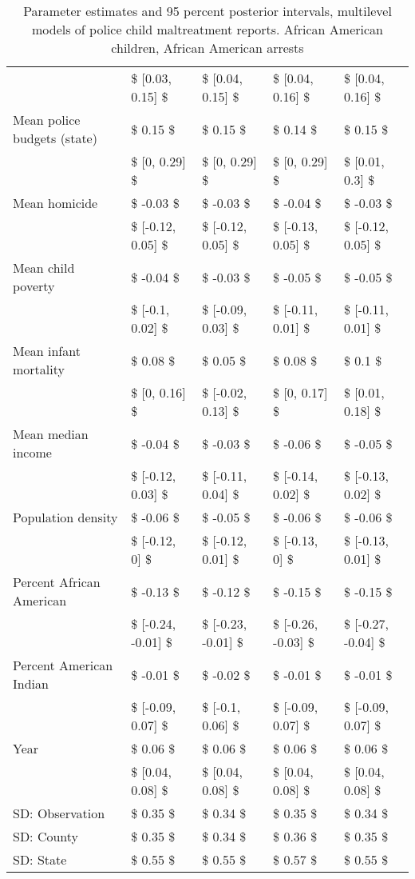 \begin{table}[ht]
\begin{tabular}{lllll}
   & \$ [0.03, 0.15] \$ & \$ [0.04, 0.15] \$ & \$ [0.04, 0.16] \$ & \$ [0.04, 0.16] \$ \\ 
  Mean police budgets (state) & \$ 0.15 \$ & \$ 0.15 \$ & \$ 0.14 \$ & \$ 0.15 \$ \\ 
   & \$ [0, 0.29] \$ & \$ [0, 0.29] \$ & \$ [0, 0.29] \$ & \$ [0.01, 0.3] \$ \\ 
  Mean homicide & \$ -0.03 \$ & \$ -0.03 \$ & \$ -0.04 \$ & \$ -0.03 \$ \\ 
   & \$ [-0.12, 0.05] \$ & \$ [-0.12, 0.05] \$ & \$ [-0.13, 0.05] \$ & \$ [-0.12, 0.05] \$ \\ 
  Mean child poverty & \$ -0.04 \$ & \$ -0.03 \$ & \$ -0.05 \$ & \$ -0.05 \$ \\ 
   & \$ [-0.1, 0.02] \$ & \$ [-0.09, 0.03] \$ & \$ [-0.11, 0.01] \$ & \$ [-0.11, 0.01] \$ \\ 
  Mean infant mortality & \$ 0.08 \$ & \$ 0.05 \$ & \$ 0.08 \$ & \$ 0.1 \$ \\ 
   & \$ [0, 0.16] \$ & \$ [-0.02, 0.13] \$ & \$ [0, 0.17] \$ & \$ [0.01, 0.18] \$ \\ 
  Mean median income & \$ -0.04 \$ & \$ -0.03 \$ & \$ -0.06 \$ & \$ -0.05 \$ \\ 
   & \$ [-0.12, 0.03] \$ & \$ [-0.11, 0.04] \$ & \$ [-0.14, 0.02] \$ & \$ [-0.13, 0.02] \$ \\ 
  Population density & \$ -0.06 \$ & \$ -0.05 \$ & \$ -0.06 \$ & \$ -0.06 \$ \\ 
   & \$ [-0.12, 0] \$ & \$ [-0.12, 0.01] \$ & \$ [-0.13, 0] \$ & \$ [-0.13, 0.01] \$ \\ 
  Percent African American & \$ -0.13 \$ & \$ -0.12 \$ & \$ -0.15 \$ & \$ -0.15 \$ \\ 
   & \$ [-0.24, -0.01] \$ & \$ [-0.23, -0.01] \$ & \$ [-0.26, -0.03] \$ & \$ [-0.27, -0.04] \$ \\ 
  Percent American Indian & \$ -0.01 \$ & \$ -0.02 \$ & \$ -0.01 \$ & \$ -0.01 \$ \\ 
   & \$ [-0.09, 0.07] \$ & \$ [-0.1, 0.06] \$ & \$ [-0.09, 0.07] \$ & \$ [-0.09, 0.07] \$ \\ 
  Year & \$ 0.06 \$ & \$ 0.06 \$ & \$ 0.06 \$ & \$ 0.06 \$ \\ 
   & \$ [0.04, 0.08] \$ & \$ [0.04, 0.08] \$ & \$ [0.04, 0.08] \$ & \$ [0.04, 0.08] \$ \\ 
  SD: Observation & \$ 0.35 \$ & \$ 0.34 \$ & \$ 0.35 \$ & \$ 0.34 \$ \\ 
  SD: County & \$ 0.35 \$ & \$ 0.34 \$ & \$ 0.36 \$ & \$ 0.35 \$ \\ 
  SD: State & \$ 0.55 \$ & \$ 0.55 \$ & \$ 0.57 \$ & \$ 0.55 \$ \\ 
   \hline
\end{tabular}
\caption{Parameter estimates and 95 percent posterior intervals, multilevel models of 
             police child maltreatment reports. African American children, African American arrests} 
\end{table}
